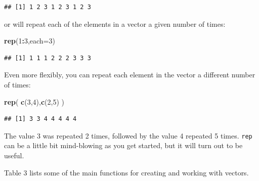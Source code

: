 \documentclass[11pt,]{article}
\newenvironment{Shaded}{\begin{snugshade}}{\end{snugshade}}
\newcommand{\DataTypeTok}[1]{\textcolor[rgb]{0.13,0.29,0.53}{#1}}
\newcommand{\DecValTok}[1]{\textcolor[rgb]{0.00,0.00,0.81}{#1}}
\newcommand{\KeywordTok}[1]{\textcolor[rgb]{0.13,0.29,0.53}{\textbf{#1}}}
\newcommand{\NormalTok}[1]{#1}
\newcommand{\OperatorTok}[1]{\textcolor[rgb]{0.81,0.36,0.00}{\textbf{#1}}}
\begin{document}
\begin{verbatim}
## [1] 1 2 3 1 2 3 1 2 3
\end{verbatim}

or will repeat each of the elements in a vector a given number of times:

\begin{Shaded}
\begin{Highlighting}[]
\KeywordTok{rep}\NormalTok{(}\DecValTok{1}\OperatorTok{:}\DecValTok{3}\NormalTok{,}\DataTypeTok{each=}\DecValTok{3}\NormalTok{)}
\end{Highlighting}
\end{Shaded}

\begin{verbatim}
## [1] 1 1 1 2 2 2 3 3 3
\end{verbatim}

Even more flexibly, you can repeat each element in the vector a different number of times:

\begin{Shaded}
\begin{Highlighting}[]
\KeywordTok{rep}\NormalTok{( }\KeywordTok{c}\NormalTok{(}\DecValTok{3}\NormalTok{,}\DecValTok{4}\NormalTok{),}\KeywordTok{c}\NormalTok{(}\DecValTok{2}\NormalTok{,}\DecValTok{5}\NormalTok{) )}
\end{Highlighting}
\end{Shaded}

\begin{verbatim}
## [1] 3 3 4 4 4 4 4
\end{verbatim}

The value 3 was repeated 2 times, followed by the value 4 repeated 5 times.
\texttt{rep} can be a little bit mind-blowing as you get started, but it will turn out to be useful.

Table 3 lists some of the main functions for creating and working with vectors.
\end{document}
